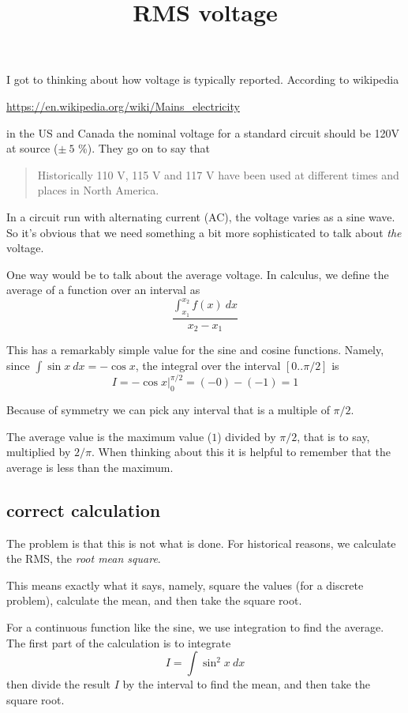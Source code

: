 \documentclass[11pt, oneside]{article}
\title{RMS voltage}
\date{}
\begin{document}
\maketitle
\Large


I got to thinking about how voltage is typically reported.  According to wikipedia

\url{https://en.wikipedia.org/wiki/Mains_electricity}

in the US and Canada the nominal voltage for a standard circuit should be 120V at source ($\pm \ 5$ \%).  They go on to say that  

\begin{quote}{Historically 110 V, 115 V and 117 V have been used at different times and places in North America.}\end{quote}

In a circuit run with alternating current (AC), the voltage varies as a sine wave.  So it's obvious that we need something a bit more sophisticated to talk about \emph{the} voltage.

One way would be to talk about the average voltage.  In calculus, we define the average of a function over an interval as
\[ \frac{\int_{x_1}^{x_2} f(x) \ dx}{x_2 - x_1} \]

This has a remarkably simple value for the sine and cosine functions.  Namely, since $\int \sin x \ dx = - \cos x$, the integral over the interval $[0 .. \pi/2]$ is
\[ I = - \cos x \bigg |_0^{\pi/2} = (- 0) - (- 1) = 1 \]

Because of symmetry we can pick any interval that is a multiple of $\pi/2$.

The average value is the maximum value ($1$) divided by $\pi/2$, that is to say, multiplied by $2/\pi$.  When thinking about this it is helpful to remember that the average is less than the maximum.

\subsection*{correct calculation}

The problem is that this is not what is done.  For historical reasons, we calculate the RMS, the \emph{root mean square}.  

This means exactly what it says, namely, square the values (for a discrete problem), calculate the mean, and then take the square root.

For a continuous function like the sine, we use integration to find the average.  The first part of the calculation is to integrate
\[ I = \int \sin^2 x \ dx \]
then divide the result $I$ by the interval to find the mean, and then take the square root.
\end{document}
